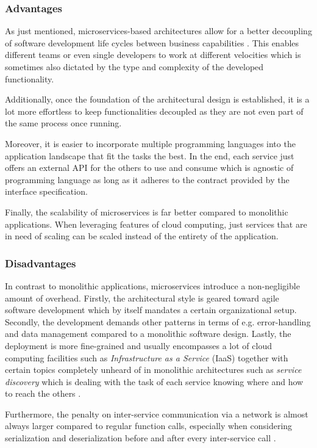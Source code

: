 \documentclass[12pt,a4paper]{report}
\begin{document}
\subsubsection{Advantages}
As just mentioned, microservices\hyp based architectures allow for a better
decoupling of software development life cycles between business capabilities \cite{ms-fowler}.
This enables different teams or even single developers to work at different
velocities which is sometimes also dictated by the type and complexity of the
developed functionality.

Additionally, once the foundation of the architectural design is established,
it is a lot more effortless to keep functionalities decoupled as
they are not even part of the same process once running.

Moreover, it is easier to incorporate multiple programming languages into
the application landscape that fit the tasks the best.
In the end, each service just offers an external API for the others to use
and consume which is agnostic of programming language as long as it adheres
to the contract provided by the interface specification.

Finally, the scalability of microservices is far better compared to monolithic
applications. When leveraging features of cloud computing, just services
that are in need of scaling can be scaled instead of the entirety of the application.


\subsubsection{Disadvantages}
In contrast to monolithic applications, microservices introduce a non\hyp negligible
amount of overhead. Firstly, the architectural style is geared toward
agile software development which by itself mandates a certain organizational setup.
Secondly, the development demands other patterns in terms of e.g.
error-handling and data management compared to a monolithic software design.
Lastly, the deployment is more fine-grained and usually encompasses a lot of
cloud computing facilities such as \textit{Infrastructure as a Service} (IaaS)
together with certain topics completely unheard of in monolithic architectures
such as \textit{service discovery} which is dealing with the task of each
service knowing where and how to reach the others \cite{newman2015building}.

Furthermore, the penalty on inter-service communication via a network is almost
always larger compared to regular function calls, especially when considering
serialization and deserialization before and after every inter-service call
\cite{knoche2016sustaining, newman2015building}.
\end{document}
